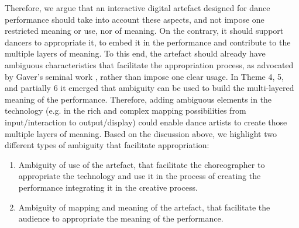 Therefore, we argue that an interactive digital artefact designed for dance performance should take into account these aspects, and not impose one restricted meaning or use, nor of meaning. On the contrary, it should support dancers to appropriate it, to embed it in the performance and contribute to the multiple layers of meaning. To this end, the artefact should already have ambiguous characteristics that facilitate the appropriation process, as advocated by Gaver's seminal work \cite{gaver_ambiguity_2003}, rather than impose one clear usage. In Theme 4, 5, and partially 6 it emerged that ambiguity can be used to build the multi-layered meaning of the performance. Therefore, adding ambiguous elements in the technology (e.g. in the rich and complex mapping possibilities from input/interaction to output/display) could enable dance artists to create those multiple layers of meaning. Based on the discussion above, we highlight two different types of ambiguity that facilitate appropriation:
\begin{enumerate}
    \item Ambiguity of use of the artefact, that facilitate the choreographer to appropriate the technology and use it in the process of creating the performance integrating it in the creative process.
    \item Ambiguity of mapping and meaning of the artefact, that facilitate the audience to appropriate the meaning of the performance.
\end{enumerate}

